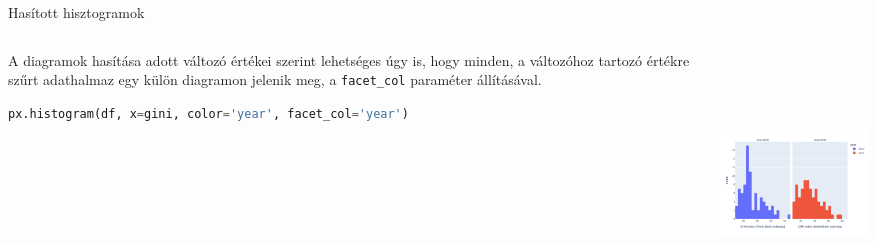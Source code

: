 \documentclass[english, aspectratio=169]{beamer}
\begin{document}
	\begin{frame}[fragile]{Hasított hisztogramok}
		\begin{columns}
			\begin{column}{.5\textwidth}
				A diagramok hasítása adott változó értékei szerint lehetséges úgy is, hogy minden, a változóhoz tartozó értékre szűrt adathalmaz egy külön diagramon jelenik meg, a \texttt{facet\_col} paraméter állításával.\par\medskip
				\begin{lstlisting}[language=python]
px.histogram(df, x=gini, color='year', facet_col='year')
				\end{lstlisting}
			\end{column}
			\begin{column}{.5\textwidth}
				\begin{center}
					\includegraphics[width=7cm, height=7cm, keepaspectratio]{images/freq_7.png}
				\end{center}
			\end{column}
		\end{columns}
	\end{frame}
	
\end{document}
